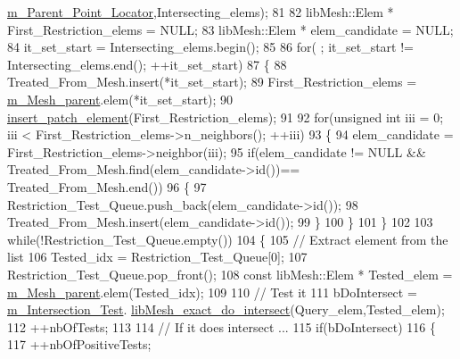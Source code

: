 \begin{DoxyCode}
      \hyperlink{classcarl_1_1_patch__construction_a382e1ea46006b1ea6445af758e157ceb}{m\_Parent\_Point\_Locator},Intersecting\_elems);
81 
82             libMesh::Elem *     First\_Restriction\_elems = NULL;
83             libMesh::Elem *     elem\_candidate = NULL;
84             it\_set\_start      = Intersecting\_elems.begin();
85 
86             \textcolor{keywordflow}{for}( ; it\_set\_start != Intersecting\_elems.end(); ++it\_set\_start)
87             \{
88                 Treated\_From\_Mesh.insert(*it\_set\_start);
89                 First\_Restriction\_elems = \hyperlink{classcarl_1_1_patch__construction_aec2f60b62d5d7b44bfcc4f9ca9de28d2}{m\_Mesh\_parent}.elem(*it\_set\_start);
90                 \hyperlink{classcarl_1_1_patch__construction_ae7a46ef950445a82cb0036b49b778fbf}{insert\_patch\_element}(First\_Restriction\_elems);
91 
92                 \textcolor{keywordflow}{for}(\textcolor{keywordtype}{unsigned} \textcolor{keywordtype}{int} iii = 0; iii < First\_Restriction\_elems->n\_neighbors(); ++iii)
93                 \{
94                     elem\_candidate = First\_Restriction\_elems->neighbor(iii);
95                     \textcolor{keywordflow}{if}(elem\_candidate != NULL && Treated\_From\_Mesh.find(elem\_candidate->id())==
      Treated\_From\_Mesh.end())
96                     \{
97                         Restriction\_Test\_Queue.push\_back(elem\_candidate->id());
98                         Treated\_From\_Mesh.insert(elem\_candidate->id());
99                     \}
100                 \}
101             \}
102 
103             \textcolor{keywordflow}{while}(!Restriction\_Test\_Queue.empty())
104             \{
105                 \textcolor{comment}{// Extract element from the list}
106                 Tested\_idx = Restriction\_Test\_Queue[0];
107                 Restriction\_Test\_Queue.pop\_front();
108                 \textcolor{keyword}{const} libMesh::Elem     * Tested\_elem = \hyperlink{classcarl_1_1_patch__construction_aec2f60b62d5d7b44bfcc4f9ca9de28d2}{m\_Mesh\_parent}.elem(Tested\_idx);
109 
110                 \textcolor{comment}{// Test it}
111                 bDoIntersect = \hyperlink{classcarl_1_1_patch__construction_a59f947d3d18761b1ad1a5913eb59ca83}{m\_Intersection\_Test}.
      \hyperlink{classcarl_1_1_intersection___tools_ae7b16748a45a0579bafecb48ef2fc4ce}{libMesh\_exact\_do\_intersect}(Query\_elem,Tested\_elem);
112                 ++nbOfTests;
113 
114                 \textcolor{comment}{// If it does intersect ...}
115                 \textcolor{keywordflow}{if}(bDoIntersect)
116                 \{
117                     ++nbOfPositiveTests;

\end{DoxyCode}
